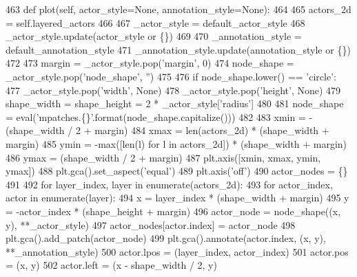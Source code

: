 \begin{DoxyCode}
463         \textcolor{keyword}{def }plot(self, actor\_style=None, annotation\_style=None):
464 
465             actors\_2d = self.layered\_actors
466 
467             \_actor\_style = default\_actor\_style
468             \_actor\_style.update(actor\_style \textcolor{keywordflow}{or} \{\})
469 
470             \_annotation\_style = default\_annotation\_style
471             \_annotation\_style.update(annotation\_style \textcolor{keywordflow}{or} \{\})
472 
473             margin = \_actor\_style.pop(\textcolor{stringliteral}{'margin'}, 0)
474             node\_shape = \_actor\_style.pop(\textcolor{stringliteral}{'node\_shape'}, \textcolor{stringliteral}{''})
475 
476             \textcolor{keywordflow}{if} node\_shape.lower() == \textcolor{stringliteral}{'circle'}:
477                 \_actor\_style.pop(\textcolor{stringliteral}{'width'}, \textcolor{keywordtype}{None})
478                 \_actor\_style.pop(\textcolor{stringliteral}{'height'}, \textcolor{keywordtype}{None})
479                 shape\_width = shape\_height = 2 * \_actor\_style[\textcolor{stringliteral}{'radius'}]
480 
481             node\_shape = eval(\textcolor{stringliteral}{'mpatches.\{\}'}.format(node\_shape.capitalize()))
482 
483             xmin = -(shape\_width / 2 + margin)
484             xmax = len(actors\_2d) * (shape\_width + margin)
485             ymin = -max([len(l) \textcolor{keywordflow}{for} l \textcolor{keywordflow}{in} actors\_2d]) * (shape\_width + margin)
486             ymax = (shape\_width / 2 + margin)
487             plt.axis([xmin, xmax, ymin, ymax])
488             plt.gca().set\_aspect(\textcolor{stringliteral}{'equal'})
489             plt.axis(\textcolor{stringliteral}{'off'})
490             actor\_nodes = \{\}
491 
492             \textcolor{keywordflow}{for} layer\_index, layer \textcolor{keywordflow}{in} enumerate(actors\_2d):
493                 \textcolor{keywordflow}{for} actor\_index, actor \textcolor{keywordflow}{in} enumerate(layer):
494                     x = layer\_index * (shape\_width + margin)
495                     y = -actor\_index * (shape\_height + margin)
496                     actor\_node = node\_shape((x, y), **\_actor\_style)
497                     actor\_nodes[actor.index] = actor\_node
498                     plt.gca().add\_patch(actor\_node)
499                     plt.gca().annotate(actor.index, (x, y), **\_annotation\_style)
500                     actor.lpos = (layer\_index, actor\_index)
501                     actor.pos = (x, y)
502                     actor.left = (x - shape\_width / 2, y)

\end{DoxyCode}
